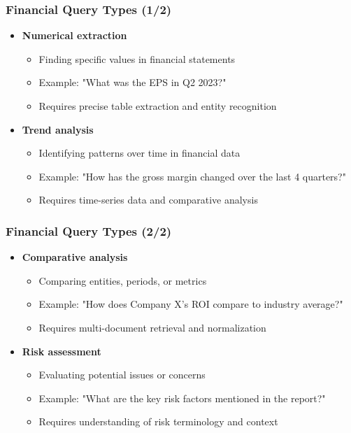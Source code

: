 \begin{frame}
    \frametitle{Financial Query Types (1/2)}
    \begin{itemize}
        \item \textbf{Numerical extraction}
        \begin{itemize}
            \item Finding specific values in financial statements
            \item Example: "What was the EPS in Q2 2023?"
            \item Requires precise table extraction and entity recognition
        \end{itemize}
        \item \textbf{Trend analysis}
        \begin{itemize}
            \item Identifying patterns over time in financial data
            \item Example: "How has the gross margin changed over the last 4 quarters?"
            \item Requires time-series data and comparative analysis
        \end{itemize}
    \end{itemize}
\end{frame}

\begin{frame}
    \frametitle{Financial Query Types (2/2)}
    \begin{itemize}
        \item \textbf{Comparative analysis}
        \begin{itemize}
            \item Comparing entities, periods, or metrics
            \item Example: "How does Company X's ROI compare to industry average?"
            \item Requires multi-document retrieval and normalization
        \end{itemize}
        \item \textbf{Risk assessment}
        \begin{itemize}
            \item Evaluating potential issues or concerns
            \item Example: "What are the key risk factors mentioned in the report?"
            \item Requires understanding of risk terminology and context
        \end{itemize}
    \end{itemize}
\end{frame}

